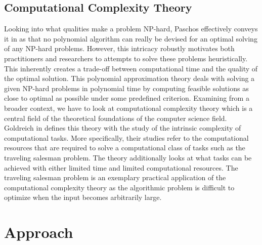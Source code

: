 \documentclass{article}
\begin{document}
\subsection{Computational Complexity Theory}
Looking into what qualities make a problem NP-hard, Paschos effectively conveys it in \cite{Paschos} as that no polynomial algorithm can really be devised for an optimal solving of any NP-hard problems. However, this intricacy robustly motivates both practitioners and researchers to attempts to solve these problems heuristically. This inherently creates a trade-off between computational time and the quality of the optimal solution. This polynomial approximation theory deals with solving a given NP-hard problems in polynomial time by computing feasible solutions as close to optimal as possible under some predefined criterion. Examining from a broader context, we have to look at computational complexity theory which is a central field of the theoretical foundations of the computer science field. Goldreich in \cite{Goldreich} defines this theory with the study of the intrinsic complexity of computational tasks. More specifically, their studies refer to the computational resources that are required to solve a computational class of tasks such as the traveling salesman problem. The theory additionally looks at what tasks can be achieved with either limited time and limited computational resources. The traveling salesman problem is an exemplary practical application of the computational complexity theory as the algorithmic problem is difficult to optimize when the input becomes arbitrarily large.


\section{Approach}
\end{document}
